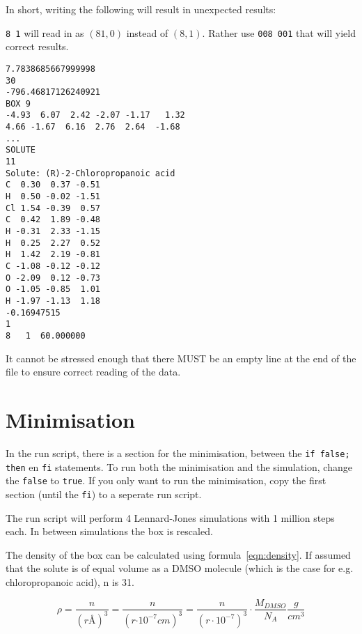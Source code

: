 In short, writing the following will result in unexpected results:

\verb|8 1| will read in as $(81, 0)$ instead of $(8, 1)$. Rather use 
\verb|008 001| that will yield correct results.

\begin{lstlisting}[caption=Example of a correct box-file]
7.7838685667999998     
30
-796.46817126240921     
BOX 9
-4.93  6.07  2.42 -2.07 -1.17   1.32     
4.66 -1.67  6.16  2.76  2.64  -1.68     
...     
SOLUTE
11
Solute: (R)-2-Chloropropanoic acid
C  0.30  0.37 -0.51
H  0.50 -0.02 -1.51
Cl 1.54 -0.39  0.57
C  0.42  1.89 -0.48
H -0.31  2.33 -1.15
H  0.25  2.27  0.52
H  1.42  2.19 -0.81
C -1.08 -0.12 -0.12
O -2.09  0.12 -0.73
O -1.05 -0.85  1.01
H -1.97 -1.13  1.18
-0.16947515     
1
8   1  60.000000

\end{lstlisting}

It cannot be stressed enough that there MUST be an empty line at the end of the 
file to ensure correct reading of the data.

\section{Minimisation}
In the run script, there is a section for the minimisation, between the 
\verb|if false; then| en \verb|fi| statements. To run both the minimisation and 
the simulation, change the \verb|false| to \verb|true|. If you only want to run 
the minimisation, copy the first section (until the \verb|fi|) to a seperate 
run script.

The run script will perform 4 Lennard-Jones simulations with 1 million steps 
each. In between simulations the box is rescaled.

The density of the box can be calculated using formula~\ref{eqn:density}. If 
assumed that the solute is of equal volume as a DMSO molecule (which is the 
case for e.g. chloropropanoic acid), n is 31.

\begin{equation} \label{eqn:density}
\rho = \dfrac{n}{(r \si{\angstrom})^3} = \dfrac{n}{(r \si{\cdot 10^{-7} cm})^3} 
=
\dfrac{n}{(r \cdot 10^{-7})^3} \cdot \dfrac{M_{DMSO}}{N_A} \dfrac{g}{cm^3}
\end{equation}